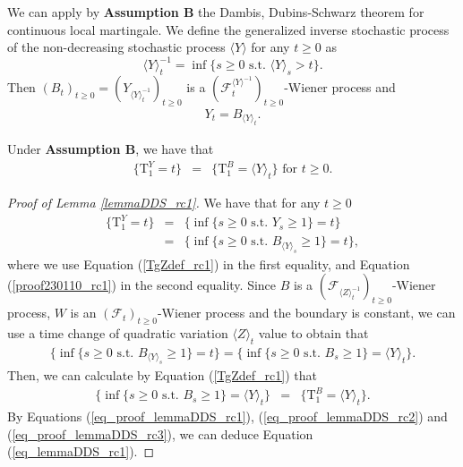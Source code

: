 \documentclass[aop]{imsart}
\theoremstyle{plain}
\theoremstyle{remark}
\newcommand{\Tau}{\mathrm{T}}
\begin{document}
\noindent We can apply by \textbf{Assumption B} the Dambis, Dubins-Schwarz theorem for continuous local martingale. We define the generalized inverse stochastic process of the non-decreasing stochastic process $\langle Y\rangle$ for any $t \geq0$ as 
$$\langle Y\rangle_{t}^{-1}=\inf\{s \geq 0 \text{ s.t. }\langle Y\rangle_{s}>t\}.$$ 
Then $(B_{t})_{t\geq 0}=(Y_{\langle Y\rangle_{t}^{-1}})_{t\geq 0}$ is a $({\mathcal {F}}_t^{\langle Y\rangle^{-1}})_{t\geq 0}$-Wiener process and 
\begin{eqnarray}
\label{proof230110_rc1}
Y_{t}=B_{\langle Y\rangle_{t}}.
\end{eqnarray}
\begin{lemma}
\label{lemmaDDS_rc1}
Under \textbf{Assumption B}, we have that
\begin{eqnarray}
\label{eq_lemmaDDS_rc1}
\big\{ \Tau_1^Y =t \big\} & = & \big\{ \Tau_1^B = \langle Y\rangle_{t} \big\} \text{ for } t \geq 0.
\end{eqnarray}
\end{lemma}
\begin{proof}[Proof of Lemma \ref{lemmaDDS_rc1}]
We have that for any $t \geq 0$
\begin{eqnarray}
\nonumber \big\{ \Tau_1^Y =t \big\} 
& = & \big\{ \inf \{s \geq 0 \text{ s.t. } Y_s \geq 1\} = t \big\}\\ \label{eq_proof_lemmaDDS_rc1} 
& = & \big\{ \inf \{s \geq 0\text{ s.t. } B_{\langle Y\rangle_{s}} \geq 1\} = t \big\},
\end{eqnarray}
where we use Equation (\ref{TgZdef_rc1}) in the first equality, and Equation (\ref{proof230110_rc1}) in the second equality. Since $B$ is a $({\mathcal {F}}_{\langle Z\rangle_{t}^{-1}})_{t\geq 0}$-Wiener process, $W$ is an $({\mathcal {F}}_{t})_{t\geq 0}$-Wiener process and the boundary is constant, we can use a time change of quadratic variation $\langle Z\rangle_t$ value to obtain that
\begin{eqnarray}
\label{eq_proof_lemmaDDS_rc2} \big\{ \inf \{s \geq 0\text{ s.t. } B_{\langle Y\rangle_{s}} \geq 1\} = t \big\} = \big\{\inf \{s \geq 0 \text{ s.t. } B_s \geq 1 \} = \langle Y\rangle_t \big\}.
\end{eqnarray}
Then, we can calculate by Equation (\ref{TgZdef_rc1}) that
\begin{eqnarray}
\label{eq_proof_lemmaDDS_rc3} \big\{\inf \{s \geq 0 \text{ s.t. } B_s \geq 1 \} = \langle Y\rangle_t \big\} & = & \big\{ \Tau^B_1 = \langle Y\rangle_t \big\}. 
\end{eqnarray}
By Equations (\ref{eq_proof_lemmaDDS_rc1}), (\ref{eq_proof_lemmaDDS_rc2}) and (\ref{eq_proof_lemmaDDS_rc3}), we can deduce Equation (\ref{eq_lemmaDDS_rc1}).
\end{proof}
\end{document}
